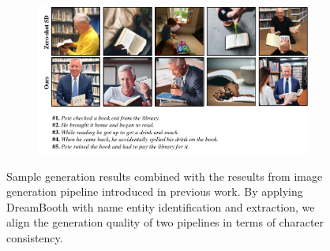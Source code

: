 \documentclass{article} %
\begin{document}
\begin{figure}[!htbp]
\begin{center}
    \begin{subfigure}
        \centering
        \includegraphics[width=0.76\linewidth]{figure/5-example.pdf}
        \caption*{}
    \end{subfigure}
\end{center}
    \caption{Sample generation results combined with the reseults from image generation pipeline introduced in previous work. By applying DreamBooth with name entity identification and extraction, we align the generation quality of two pipelines in terms of character consistency.}
    \label{fig:plutchikLabel}
\end{figure}
\end{document}
